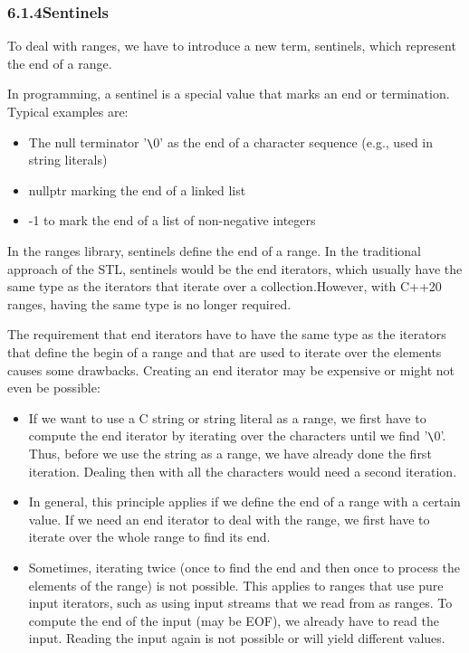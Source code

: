 \subsubsection*{ 6.1.4\hspace{0.2cm}Sentinels}

To deal with ranges, we have to introduce a new term, sentinels, which represent the end of a range.

In programming, a sentinel is a special value that marks an end or termination. Typical examples are:

\begin{itemize}
\item
The null terminator ’\verb|\|0’ as the end of a character sequence (e.g., used in string literals)

\item
nullptr marking the end of a linked list

\item
-1 to mark the end of a list of non-negative integers
\end{itemize}

In the ranges library, sentinels define the end of a range. In the traditional approach of the STL, sentinels would be the end iterators, which usually have the same type as the iterators that iterate over a collection.However, with C++20 ranges, having the same type is no longer required.

The requirement that end iterators have to have the same type as the iterators that define the begin of a range and that are used to iterate over the elements causes some drawbacks. Creating an end iterator may be expensive or might not even be possible:

\begin{itemize}
\item
If we want to use a C string or string literal as a range, we first have to compute the end iterator by iterating over the characters until we find ’\verb|\|0’. Thus, before we use the string as a range, we have already done the first iteration. Dealing then with all the characters would need a second iteration.

\item
In general, this principle applies if we define the end of a range with a certain value. If we need an end iterator to deal with the range, we first have to iterate over the whole range to find its end.

\item
Sometimes, iterating twice (once to find the end and then once to process the elements of the range) is not possible. This applies to ranges that use pure input iterators, such as using input streams that we read from as ranges. To compute the end of the input (may be EOF), we already have to read the input. Reading the input again is not possible or will yield different values.
\end{itemize}

